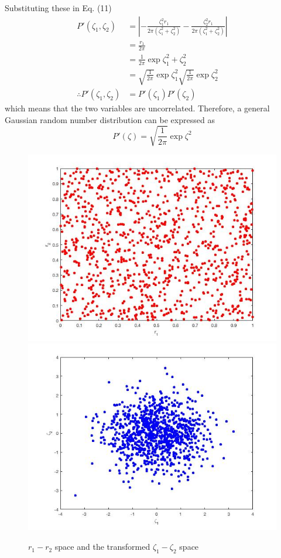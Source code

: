 \documentclass[12pt, oneside]{article}   	%
\begin{document}
Substituting these in Eq. (11)
	\begin{align} 
	 P'(\zeta_1, \zeta_2) &= \left| -\frac{\zeta_1^2 r_1}{2\pi(\zeta_1 ^2 + \zeta_2 ^2)} -\frac{\zeta_2^2 r_1}{2\pi(\zeta_1 ^2 + \zeta_2 ^2)} \right| \\
	&= \frac{r_1}{2 \pi} \\
	&= \frac{1}{2\pi} \exp{\zeta_1 ^2 + \zeta_2 ^2} \\
	&= \sqrt{\frac{1}{2\pi}} \exp{\zeta_1 ^2} \sqrt{\frac{1}{2\pi}} \exp{\zeta_2 ^2} \\
	\therefore P'(\zeta_1, \zeta_2) &= P'(\zeta_1) P'(\zeta_2)
	\end{align}
which means that the two variables are uncorrelated. Therefore, a general Gaussian random number distribution can be expressed as 
$$ P'(\zeta) = \sqrt{\frac{1}{2\pi}} \exp{\zeta ^2} $$
	\begin{figure} [!htbp]
	 \includegraphics[scale=0.40]{r1r2_space.jpg}
	 \includegraphics[scale=0.40]{zeta1zeta2_space.jpg}
	\caption{$r_1-r_2$ space and the transformed $\zeta_1-\zeta_2$ space}
	\end{figure}
\end{document}
